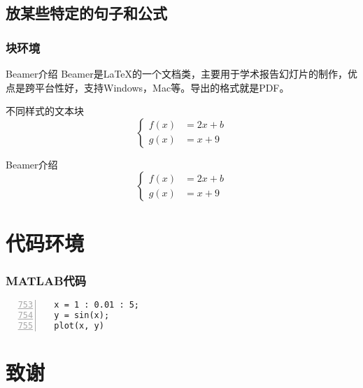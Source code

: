 \documentclass[aspectratio=169, 10pt, utf8, mathserif]{beamer}
\begin{document}
\subsection{放某些特定的句子和公式}
\begin{frame}
 \frametitle{块环境}
 \begin{exampleblock}{Beamer介绍}
 Beamer是\LaTeX 的一个文档类，主要用于学术报告幻灯片的制作，优点是跨平台性好，支持Windows，Mac等。导出的格式就是PDF。
 \end{exampleblock}
 \begin{alertblock}{不同样式的文本块}
 \begin{equation}
  \left \{
  \begin{aligned}
  f(x) &= 2x + b \\
  g(x) &= x + 9
  \end{aligned} 
  \right.
  \end{equation}
 \end{alertblock}
 \begin{block}{Beamer介绍}
 \begin{equation}
 \left \{
 \begin{aligned}
 f(x) &= 2x + b \\
 g(x) &= x + 9
 \end{aligned} 
 \right.
 \end{equation}
 \end{block}

\end{frame}


\section{代码环境}
\begin{frame}[fragile] %
 \frametitle{MATLAB代码}  
 \begin{lstlisting}[numbers=left, firstnumber=753]
  % 绘制图形
  x = 1 : 0.01 : 5;
  y = sin(x);
  plot(x, y)
 \end{lstlisting}
\end{frame}

\section{致谢}
\begin{frame}
\end{frame}
\end{document}
